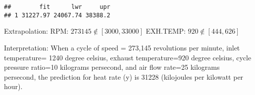 \documentclass[
]{article}
\begin{document}
\begin{verbatim}
##        fit      lwr     upr
## 1 31227.97 24067.74 38388.2
\end{verbatim}

Extrapolation: RPM: \(273145 \notin [3000, 33000]\) EXH.TEMP:
\(920 \notin [444, 626]\)

Interpretation: When a cycle of speed = 273,145 revolutions per minute,
inlet temperature= 1240 degree celsius, exhaust temperature=920 degree
celsius, cycle pressure ratio=10 kilograms persecond, and air flow
rate=25 kilograms persecond, the prediction for heat rate (y) is 31228
(kilojoules per kilowatt per hour).
\end{document}
